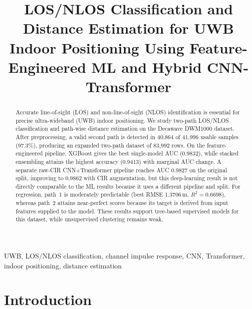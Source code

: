 \documentclass[conference]{IEEEtran}
\begin{document}
\title{LOS/NLOS Classification and Distance Estimation for UWB Indoor Positioning Using Feature-Engineered ML and Hybrid CNN-Transformer}

\author{
}

\maketitle

\begin{abstract}
Accurate line-of-sight (LOS) and non-line-of-sight (NLOS) identification is essential for precise ultra-wideband (UWB) indoor positioning. We study two-path LOS/NLOS classification and path-wise distance estimation on the Decawave DWM1000 dataset. After preprocessing, a valid second path is detected in 40,864 of 41,996 usable samples (97.3\%), producing an expanded two-path dataset of 83,992 rows. On the feature-engineered pipeline, XGBoost gives the best single-model AUC (0.9832), while stacked ensembling attains the highest accuracy (0.9413) with marginal AUC change. A separate raw-CIR CNN+Transformer pipeline reaches AUC 0.9827 on the original split, improving to 0.9862 with CIR augmentation, but this deep-learning result is not directly comparable to the ML results because it uses a different pipeline and split. For regression, path~1 is moderately predictable (best RMSE 1.3706\,m, $R^2=0.6698$), whereas path~2 attains near-perfect scores because its target is derived from input features supplied to the model. These results support tree-based supervised models for this dataset, while unsupervised clustering remains weak.
\end{abstract}

\begin{IEEEkeywords}
UWB, LOS/NLOS classification, channel impulse response, CNN, Transformer, indoor positioning, distance estimation
\end{IEEEkeywords}

\section{Introduction}
\end{document}
